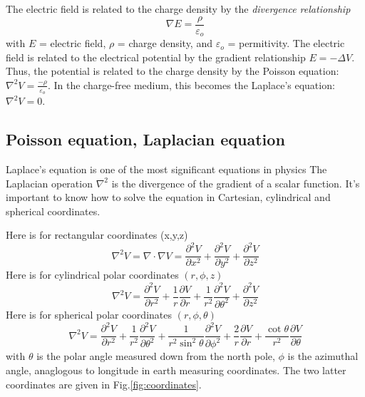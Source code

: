 \begin{framed}
The electric field is related to the charge
density by the {\it divergence relationship}
\begin{equation}
\nabla E = \frac{\rho}{\varepsilon_o}
\end{equation}
with $E$ = electric field, $\rho$ = charge density, and $\varepsilon_o$ =
permitivity. The electric field is related to the electrical potential by the
gradient relationship $E=-\Delta V$. Thus, the potential is related to the
charge density by the Poisson equation:
  $\nabla^2 V = \frac{-\rho}{\varepsilon_o}$. In the charge-free medium, this
  becomes the Laplace's equation: $\nabla^2 V = 0$.

\end{framed}  

\subsection{Poisson equation, Laplacian equation}

Laplace's equation is one of the most significant equations in physics
The Laplacian operation $\nabla^2$ is the divergence of the gradient of a
scalar function. It's important to know how to solve the equation in Cartesian,
cylindrical and spherical coordinates.

Here is for rectangular coordinates (x,y,z)
\begin{equation}
\nabla^2 V= \nabla\cdot\nabla V=\frac{\partial^2 V}{\partial x^2} +
\frac{\partial^2 V}{\partial y^2} + \frac{\partial^2 V}{\partial z^2}
\end{equation}  
Here is for cylindrical polar coordinates $(r,\phi,z)$
\begin{equation}
\nabla^2 V = \frac{\partial^2V}{\partial r^2} +
\frac{1}{r}\frac{\partial V}{\partial r} + \frac{1}{r^2}
\frac{\partial^2V}{\partial \theta^2} + \frac{\partial^2V}{\partial z^2}
\end{equation}
Here is for spherical polar coordinates $(r,\phi,\theta)$
\begin{equation}
\label{eq:spc}
\nabla^2 V = \frac{\partial^2V}{\partial r^2} +
\frac{1}{r^2}\frac{\partial^2V}{\partial \theta^2} +
\frac{1}{r^2\sin^2\theta}\frac{\partial^2V}{\partial \phi^2} +
\frac{2}{r}\frac{\partial V}{\partial r} + 
\frac{\cot\theta}{r^2} \frac{\partial V}{\partial \theta} 
\end{equation}
with $\theta$ is the polar angle measured down from the north pole, $\phi$ is
the azimuthal angle, anaglogous to longitude in earth measuring coordinates.
The two latter coordinates are given in Fig.\ref{fig:coordinates}.


